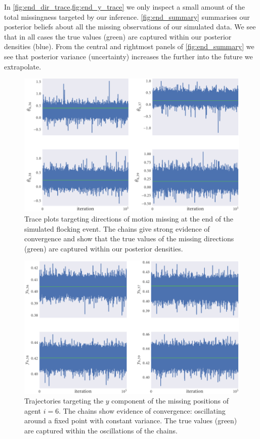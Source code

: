 In \cref{fig:end_dir_trace,fig:end_y_trace} we only inspect a small amount of
the total missingness targeted by our inference. \cref{fig:end_summary}
summarises our posterior beliefs about all the missing observations of our
simulated data. We see that in all cases the true values (green) are captured
within our posterior densities (blue). From the central and rightmost panels of
\cref{fig:end_summary} we see that posterior variance (uncertainty) increases
the further into the future we extrapolate.

\begin{figure}[tbp]
  \includegraphics{end/dir_trace.pdf}
  \caption{Trace plots targeting directions of motion missing at the end of the
  simulated flocking event. The chains give strong evidence of convergence and
  show that the true values of the missing directions (green) are captured within
  our posterior densities.}
  \label{fig:end_dir_trace}
\end{figure}
\begin{figure}[tbp]
  \includegraphics{end/y_trace.pdf}
  \caption{Trajectories targeting the $y$ component of the missing positions of
    agent $i=6$. The chains show evidence of convergence: oscillating around
    a fixed point with constant variance. The true values (green) are
    captured within the oscillations of the chains.}
  \label{fig:end_y_trace}
\end{figure}
